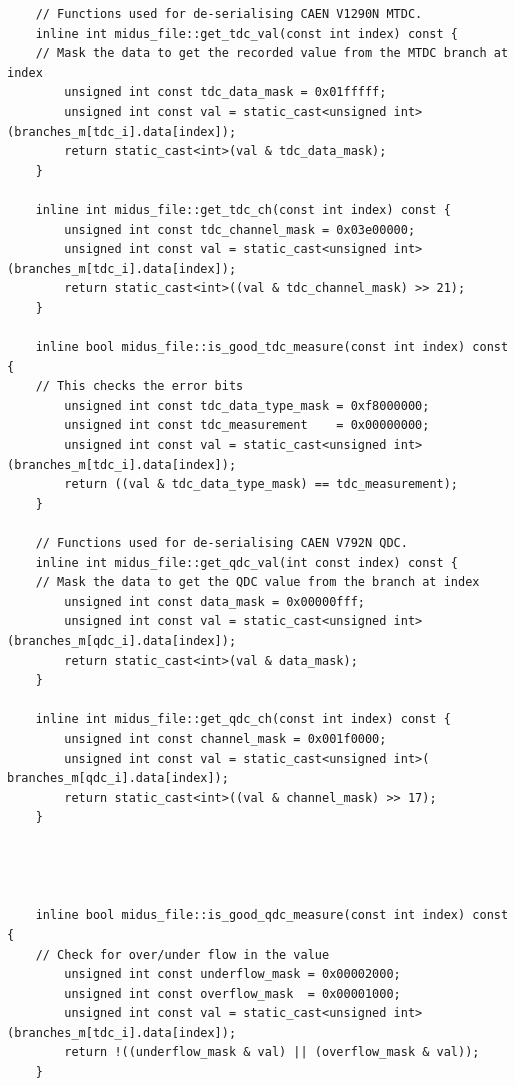 \documentclass[]{article}
\begin{document}
\begin{verbatim}
    // Functions used for de-serialising CAEN V1290N MTDC.
    inline int midus_file::get_tdc_val(const int index) const {
    // Mask the data to get the recorded value from the MTDC branch at index
        unsigned int const tdc_data_mask = 0x01fffff;
        unsigned int const val = static_cast<unsigned int>(branches_m[tdc_i].data[index]);
        return static_cast<int>(val & tdc_data_mask);
    }
    
    inline int midus_file::get_tdc_ch(const int index) const {
        unsigned int const tdc_channel_mask = 0x03e00000;
        unsigned int const val = static_cast<unsigned int>(branches_m[tdc_i].data[index]);
        return static_cast<int>((val & tdc_channel_mask) >> 21);
    }
    
    inline bool midus_file::is_good_tdc_measure(const int index) const {
    // This checks the error bits
        unsigned int const tdc_data_type_mask = 0xf8000000;
        unsigned int const tdc_measurement    = 0x00000000;
        unsigned int const val = static_cast<unsigned int>(branches_m[tdc_i].data[index]);
        return ((val & tdc_data_type_mask) == tdc_measurement);
    }
    
    // Functions used for de-serialising CAEN V792N QDC.
    inline int midus_file::get_qdc_val(int const index) const {
    // Mask the data to get the QDC value from the branch at index
        unsigned int const data_mask = 0x00000fff;
        unsigned int const val = static_cast<unsigned int>(branches_m[qdc_i].data[index]);
        return static_cast<int>(val & data_mask); 
    }
    
    inline int midus_file::get_qdc_ch(const int index) const {
        unsigned int const channel_mask = 0x001f0000;
        unsigned int const val = static_cast<unsigned int>( branches_m[qdc_i].data[index]);
        return static_cast<int>((val & channel_mask) >> 17);
    }
    
    
    
    
    inline bool midus_file::is_good_qdc_measure(const int index) const {
    // Check for over/under flow in the value
        unsigned int const underflow_mask = 0x00002000;
        unsigned int const overflow_mask  = 0x00001000;
        unsigned int const val = static_cast<unsigned int>(branches_m[tdc_i].data[index]);
        return !((underflow_mask & val) || (overflow_mask & val));
    }
\end{verbatim}
\end{document}
